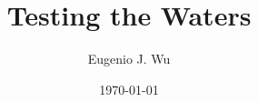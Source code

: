\documentclass[12pt]{article}
\title{Testing the Waters}
\author{Eugenio J. Wu}
\date{\today}
\begin{document}
\maketitle \pagebreak

\tableofcontents \pagebreak
\end{document}
